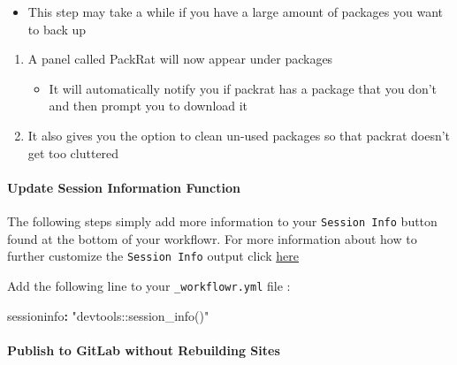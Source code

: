 \documentclass[openany]{article}
\newenvironment{Shaded}{\begin{snugshade}}{\end{snugshade}}
\newcommand{\NormalTok}[1]{#1}
\newcommand{\OperatorTok}[1]{\textcolor[rgb]{0.81,0.36,0.00}{\textbf{#1}}}
\newcommand{\StringTok}[1]{\textcolor[rgb]{0.31,0.60,0.02}{#1}}
\providecommand{\tightlist}{%
  \setlength{\itemsep}{0pt}\setlength{\parskip}{0pt}}
\let\oldparagraph\paragraph
\renewcommand{\paragraph}[1]{\oldparagraph{#1}\mbox{}}
\begin{document}
\begin{itemize}
\tightlist
\item
  This step may take a while if you have a large amount of packages you want to back up
\end{itemize}

\begin{enumerate}
\def\labelenumi{\arabic{enumi}.}
\setcounter{enumi}{2}
\tightlist
\item
  A panel called PackRat will now appear under packages

  \begin{itemize}
  \tightlist
  \item
    It will automatically notify you if packrat has a package that you don't and then prompt you to download it
  \end{itemize}
\item
  It also gives you the option to clean un-used packages so that packrat doesn't get too cluttered
\end{enumerate}

\hypertarget{update-session-information-function-1}{%
\paragraph{Update Session Information Function}\label{update-session-information-function-1}}

The following steps simply add more information to your \texttt{Session\ Info} button found at the bottom of your workflowr. For more information about how to further customize the \texttt{Session\ Info} output click \href{https://jdblischak.github.io/workflowr/articles/wflow-02-customization.html}{here}

Add the following line to your \texttt{\_workflowr.yml} file :

\begin{Shaded}
\begin{Highlighting}[]
\NormalTok{sessioninfo}\OperatorTok{:}\StringTok{ "devtools::session_info()"}
\end{Highlighting}
\end{Shaded}

\hypertarget{publish-to-gitlab-without-rebuilding-sites-1}{%
\paragraph{Publish to GitLab without Rebuilding Sites}\label{publish-to-gitlab-without-rebuilding-sites-1}}
\end{document}

